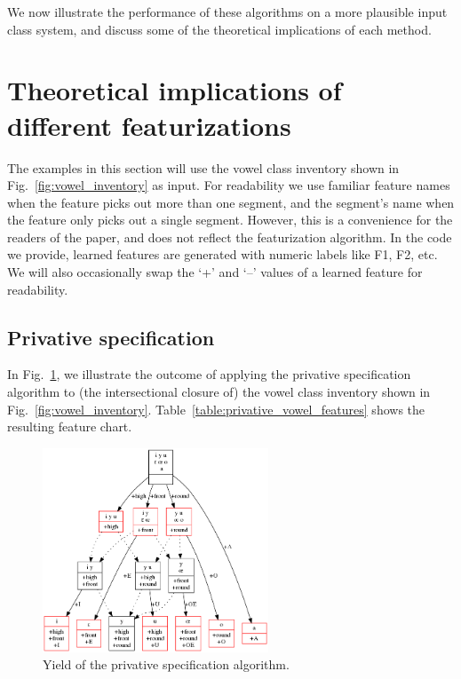 \documentclass[12pt, oneside]{article}   	%
\begin{document}
We now illustrate the performance of these algorithms on a more plausible input class system, and discuss some of the theoretical implications of each method.

\FloatBarrier
\section{Theoretical implications of different featurizations}
\label{sec:theoretical_implications}

The examples in this section will use the vowel class inventory shown in Fig.~\ref{fig:vowel_inventory} as input. For readability we use familiar feature names when the feature picks out more than one segment, and the segment's name when the feature only picks out a single segment. However, this is a convenience for the readers of the paper, and does not reflect the featurization algorithm. In the code we provide, learned features are generated with numeric labels like F1, F2, etc. We will also occasionally swap the `+' and `--' values of a learned feature for readability.

\subsection{Privative specification}

In Fig.~\ref{fig:privative}, we illustrate the outcome of applying the privative specification algorithm to (the intersectional closure of) the vowel class inventory shown in Fig.~\ref{fig:vowel_inventory}. Table~\ref{table:privative_vowel_features} shows the resulting feature chart.

\begin{figure}[htb!]
	\centering
	\includegraphics[width=0.6\textwidth]{vowel_inventory_privative.png}
	\caption{Yield of the privative specification algorithm.}
	\label{fig:privative}
\end{figure}
\end{document}
